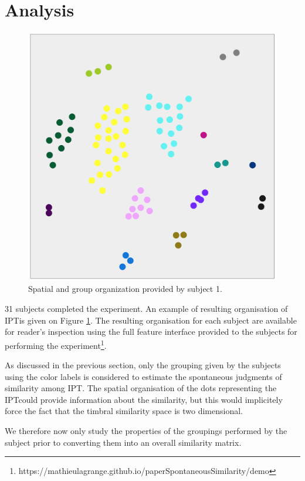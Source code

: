\documentclass{article}
\newcommand{\ipt}{IPT}
\begin{document}
\section{Analysis}\label{sec:analysis}

\begin{figure}
\center
\includegraphics[width = \textwidth]{figures/xp2example.png}
\caption{Spatial and group organization provided by subject 1.}
\label{fig:xp2display}
\end{figure}

31 subjects completed the experiment. An example of resulting organisation of \ipt is given on Figure \ref{fig:xp2display}. The resulting organisation for each subject are available for reader's inspection using the full feature interface provided to the subjects for performing the experiment\footnote{https://mathieulagrange.github.io/paperSpontaneousSimilarity/demo}.

As discussed in the previous section, only the grouping given by the subjects using the color labels is considered to estimate the spontaneous judgments of similarity among \ipt. The spatial organisation of the dots representing the \ipt could provide information about the similarity, but this would implicitely force the fact that the timbral similarity space is two dimensional.

We therefore now only study the properties of the groupings performed by the subject prior to converting them into an overall similarity matrix.
\end{document}
